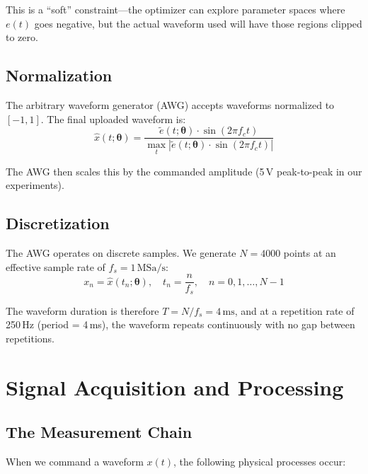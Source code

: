 \documentclass[11pt]{article}
\begin{document}
This is a ``soft'' constraint---the optimizer can explore parameter spaces where $e(t)$ goes negative, but the actual waveform used will have those regions clipped to zero.

\subsection{Normalization}

The arbitrary waveform generator (AWG) accepts waveforms normalized to $[-1, 1]$. The final uploaded waveform is:
\begin{equation}
    \hat{x}(t; \boldsymbol{\theta}) = \frac{\tilde{e}(t; \boldsymbol{\theta}) \cdot \sin(2\pi f_c t)}{\max_t \left| \tilde{e}(t; \boldsymbol{\theta}) \cdot \sin(2\pi f_c t) \right|}
\end{equation}

The AWG then scales this by the commanded amplitude (5\,V peak-to-peak in our experiments).

\subsection{Discretization}

The AWG operates on discrete samples. We generate $N = 4000$ points at an effective sample rate of $f_s = 1\,\text{MSa/s}$:
\begin{equation}
    x_n = \hat{x}(t_n; \boldsymbol{\theta}), \quad t_n = \frac{n}{f_s}, \quad n = 0, 1, \ldots, N-1
\end{equation}

The waveform duration is therefore $T = N/f_s = 4\,\text{ms}$, and at a repetition rate of 250\,Hz (period = 4\,ms), the waveform repeats continuously with no gap between repetitions.

\section{Signal Acquisition and Processing}

\subsection{The Measurement Chain}

When we command a waveform $x(t)$, the following physical processes occur:
\end{document}
